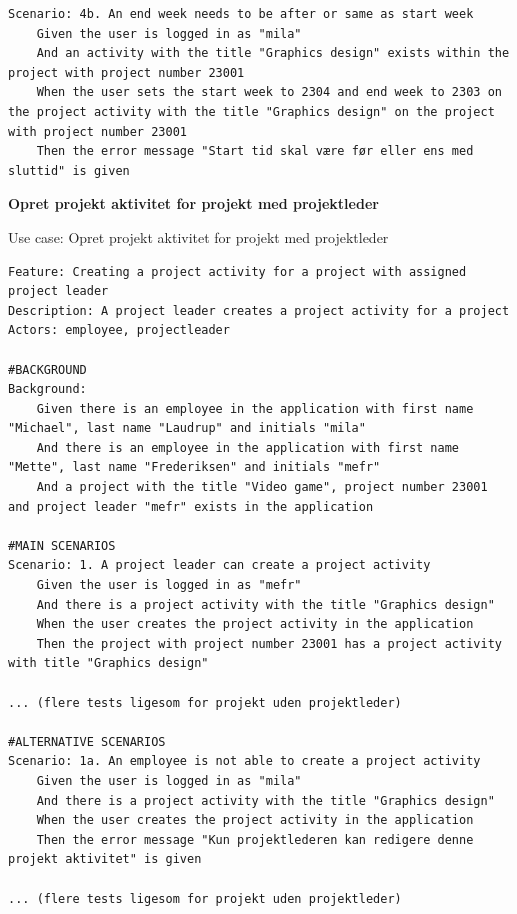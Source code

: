 \begin{listing}[H]
\begin{verbatim}
Scenario: 4b. An end week needs to be after or same as start week
    Given the user is logged in as "mila"
    And an activity with the title "Graphics design" exists within the project with project number 23001
    When the user sets the start week to 2304 and end week to 2303 on the project activity with the title "Graphics design" on the project with project number 23001
    Then the error message "Start tid skal være før eller ens med sluttid" is given
    \end{verbatim}
\end{listing}
\textbf{Opret projekt aktivitet for projekt med projektleder}
\begin{listing}[H]
    \centering
    \caption{Use case: Opret projekt aktivitet for projekt med projektleder} \label{lst:usecase_project_activity_with_leader}
    \begin{verbatim}  
Feature: Creating a project activity for a project with assigned project leader
Description: A project leader creates a project activity for a project
Actors: employee, projectleader

#BACKGROUND
Background:
    Given there is an employee in the application with first name "Michael", last name "Laudrup" and initials "mila"
    And there is an employee in the application with first name "Mette", last name "Frederiksen" and initials "mefr"
    And a project with the title "Video game", project number 23001 and project leader "mefr" exists in the application

#MAIN SCENARIOS
Scenario: 1. A project leader can create a project activity
    Given the user is logged in as "mefr"
    And there is a project activity with the title "Graphics design"  
    When the user creates the project activity in the application 
    Then the project with project number 23001 has a project activity with title "Graphics design" 

... (flere tests ligesom for projekt uden projektleder)

#ALTERNATIVE SCENARIOS
Scenario: 1a. An employee is not able to create a project activity
    Given the user is logged in as "mila"
    And there is a project activity with the title "Graphics design"  
    When the user creates the project activity in the application 
    Then the error message "Kun projektlederen kan redigere denne projekt aktivitet" is given
    
... (flere tests ligesom for projekt uden projektleder)

    \end{verbatim}
\end{listing}
